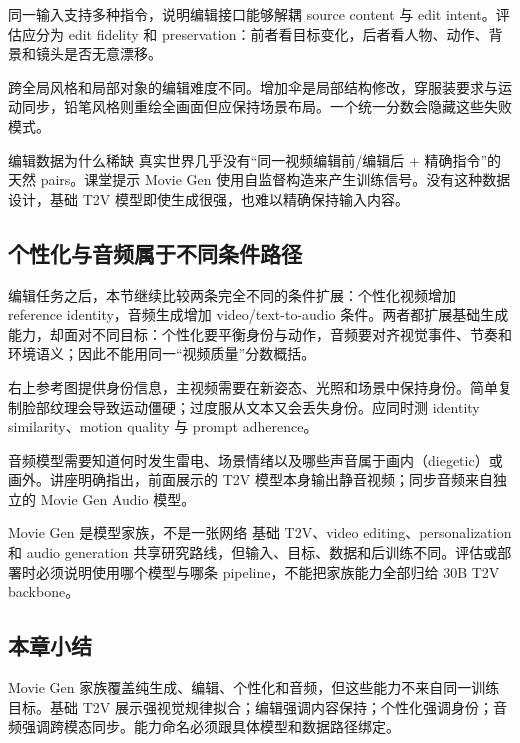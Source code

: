 
同一输入支持多种指令，说明编辑接口能够解耦 source content 与 edit intent。评估应分为 edit fidelity 和 preservation：前者看目标变化，后者看人物、动作、背景和镜头是否无意漂移。


跨全局风格和局部对象的编辑难度不同。增加伞是局部结构修改，穿服装要求与运动同步，铅笔风格则重绘全画面但应保持场景布局。一个统一分数会隐藏这些失败模式。

\begin{knowledgebox}{编辑数据为什么稀缺}
真实世界几乎没有“同一视频编辑前/编辑后 + 精确指令”的天然 pairs。课堂提示 Movie Gen 使用自监督构造来产生训练信号。没有这种数据设计，基础 T2V 模型即使生成很强，也难以精确保持输入内容。
\end{knowledgebox}

\subsection{个性化与音频属于不同条件路径}

编辑任务之后，本节继续比较两条完全不同的条件扩展：个性化视频增加 reference identity，音频生成增加 video/text-to-audio 条件。两者都扩展基础生成能力，却面对不同目标：个性化要平衡身份与动作，音频要对齐视觉事件、节奏和环境语义；因此不能用同一“视频质量”分数概括。


右上参考图提供身份信息，主视频需要在新姿态、光照和场景中保持身份。简单复制脸部纹理会导致运动僵硬；过度服从文本又会丢失身份。应同时测 identity similarity、motion quality 与 prompt adherence。


音频模型需要知道何时发生雷电、场景情绪以及哪些声音属于画内（diegetic）或画外。讲座明确指出，前面展示的 T2V 模型本身输出静音视频；同步音频来自独立的 Movie Gen Audio 模型。

\begin{importantbox}{Movie Gen 是模型家族，不是一张网络}
基础 T2V、video editing、personalization 和 audio generation 共享研究路线，但输入、目标、数据和后训练不同。评估或部署时必须说明使用哪个模型与哪条 pipeline，不能把家族能力全部归给 30B T2V backbone。
\end{importantbox}


\subsection{本章小结}

Movie Gen 家族覆盖纯生成、编辑、个性化和音频，但这些能力不来自同一训练目标。基础 T2V 展示强视觉规律拟合；编辑强调内容保持；个性化强调身份；音频强调跨模态同步。能力命名必须跟具体模型和数据路径绑定。

